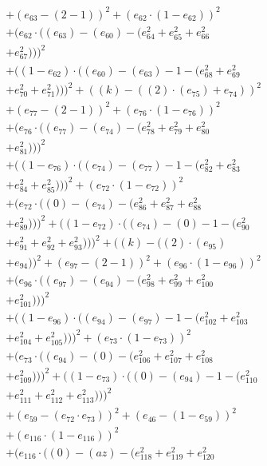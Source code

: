 \documentclass[10pt, a4paper]{article}
\begin{document}
\begin{small}
\begin{align*}
& + (e_{63} - (2 - 1))^{2} + (e_{62}  \cdot  (1 - e_{62}))^{2} \\
& + (e_{62}  \cdot  ((e_{63}) - (e_{60}) - (e_{64}^{2} + e_{65}^{2} + e_{66}^{2} \\
& + e_{67}^{2})))^{2} \\
& + ((1 - e_{62})  \cdot  ((e_{60}) - (e_{63}) - 1 - (e_{68}^{2} + e_{69}^{2} \\
& + e_{70}^{2} + e_{71}^{2})))^{2} + ((k) - ((2)  \cdot  (e_{75}) + e_{74}))^{2} \\
& + (e_{77} - (2 - 1))^{2} + (e_{76}  \cdot  (1 - e_{76}))^{2} \\
& + (e_{76}  \cdot  ((e_{77}) - (e_{74}) - (e_{78}^{2} + e_{79}^{2} + e_{80}^{2} \\
& + e_{81}^{2})))^{2} \\
& + ((1 - e_{76})  \cdot  ((e_{74}) - (e_{77}) - 1 - (e_{82}^{2} + e_{83}^{2} \\
& + e_{84}^{2} + e_{85}^{2})))^{2} + (e_{72}  \cdot  (1 - e_{72}))^{2} \\
& + (e_{72}  \cdot  ((0) - (e_{74}) - (e_{86}^{2} + e_{87}^{2} + e_{88}^{2} \\
& + e_{89}^{2})))^{2} + ((1 - e_{72})  \cdot  ((e_{74}) - (0) - 1 - (e_{90}^{2} \\
& + e_{91}^{2} + e_{92}^{2} + e_{93}^{2})))^{2} + ((k) - ((2)  \cdot  (e_{95}) \\
& + e_{94}))^{2} + (e_{97} - (2 - 1))^{2} + (e_{96}  \cdot  (1 - e_{96}))^{2} \\
& + (e_{96}  \cdot  ((e_{97}) - (e_{94}) - (e_{98}^{2} + e_{99}^{2} + e_{100}^{2} \\
& + e_{101}^{2})))^{2} \\
& + ((1 - e_{96})  \cdot  ((e_{94}) - (e_{97}) - 1 - (e_{102}^{2} + e_{103}^{2} \\
& + e_{104}^{2} + e_{105}^{2})))^{2} + (e_{73}  \cdot  (1 - e_{73}))^{2} \\
& + (e_{73}  \cdot  ((e_{94}) - (0) - (e_{106}^{2} + e_{107}^{2} + e_{108}^{2} \\
& + e_{109}^{2})))^{2} + ((1 - e_{73})  \cdot  ((0) - (e_{94}) - 1 - (e_{110}^{2} \\
& + e_{111}^{2} + e_{112}^{2} + e_{113}^{2})))^{2} \\
& + (e_{59} - (e_{72}  \cdot  e_{73}))^{2} + (e_{46} - (1 - e_{59}))^{2} \\
& + (e_{116}  \cdot  (1 - e_{116}))^{2} \\
& + (e_{116}  \cdot  ((0) - (az) - (e_{118}^{2} + e_{119}^{2} + e_{120}^{2} \\

\end{align*}
\end{small}
\end{document}
